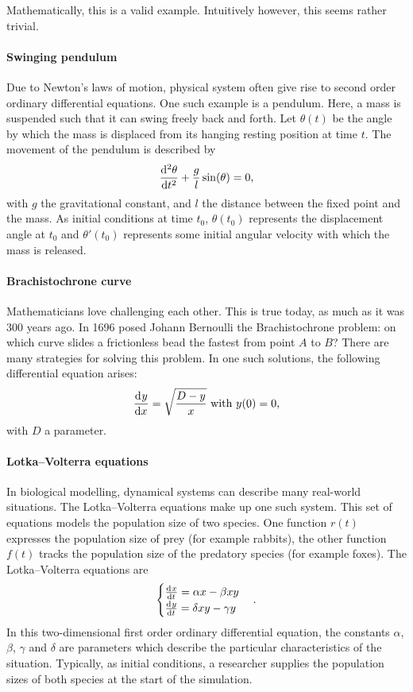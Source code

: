 Mathematically, this is a valid example. Intuitively however, this seems rather trivial.

\paragraph{Swinging pendulum} Due to Newton's laws of motion, physical system often give rise to second order ordinary differential equations. One such example is a pendulum. Here, a mass is suspended such that it can swing freely back and forth. Let $\theta(t)$ be the angle by which the mass is displaced from its hanging resting position at time $t$. The movement of the pendulum is described by
$$
    \dv[2]{\theta}{t} + \frac{g}{l} \sin(\theta) = 0\text{,}
$$
with $g$ the gravitational constant, and $l$ the distance between the fixed point and the mass. As initial conditions at time $t_0$, $\theta(t_0)$ represents the displacement angle at $t_0$ and $\theta'(t_0)$ represents some initial angular velocity with which the mass is released.

\paragraph{Brachistochrone curve} Mathematicians love challenging each other. This is true today, as much as it was 300 years ago. In 1696 posed Johann Bernoulli the Brachistochrone problem: on which curve slides a frictionless bead the fastest from point $A$ to $B$? There are many strategies for solving this problem. In one such solutions, the following differential equation arises:
$$
    {\dv[]{y}{x}} = \sqrt{\frac{D - y}{x}} \text{ with $y(0) = 0$,}
$$
with $D$ a parameter.

\paragraph{Lotka--Volterra equations} In biological modelling, dynamical systems can describe many real-world situations. The Lotka--Volterra equations make up one such system. This set of equations models the population size of two species. One function $r(t)$ expresses the population size of prey (for example rabbits), the other function $f(t)$ tracks the population size of the predatory species (for example foxes). The Lotka--Volterra equations are
$$
    \begin{cases}
        \dv[]{x}{t} = \alpha x - \beta x y  \\
        \dv[]{y}{t} = \delta x y - \gamma y \\
    \end{cases}\text{.}
$$
In this two-dimensional first order ordinary differential equation, the constants $\alpha$, $\beta$, $\gamma$ and $\delta$ are parameters which describe the particular characteristics of the situation. Typically, as initial conditions, a researcher supplies the population sizes of both species at the start of the simulation.

